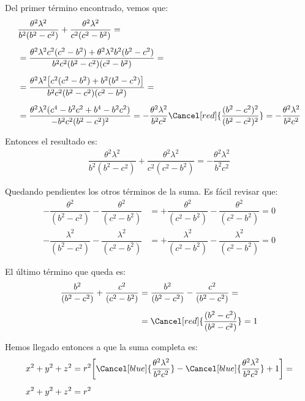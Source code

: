 Del primer término encontrado, vemos que:
\begin{align*}
&{}\dfrac{\theta^{2} \lambda^{2}}{b^{2}(b^{2} - c^{2})} + \dfrac{\theta^{2} \lambda^{2}}{c^{2}(c^{2} - b^{2})} = \\[0.5em] 
&= \dfrac{\theta^{2} \lambda^{2} c^{2} (c^{2} - b^{2}) + \theta^{2} \lambda^{2} b^{2} (b^{2} - c^{2})}{b^{2} c^{2}(b^{2} - c^{2})(c^{2} - b^{2})} = \\[0.5em] 
&= \dfrac{\theta^{2} \lambda^{2} \big[ c^{2} (c^{2} - b^{2}) + b^{2} (b^{2} - c^{2}) \big]}{b^{2} c^{2}(b^{2} - c^{2})(c^{2} - b^{2})} = \\[0.5em] 
&= \dfrac{\theta^{2} \lambda^{2} (c^{4} - b^{2} c^{2} + b^{4} -b^{2} c^{2})}{-b^{2} c^{2} (b^{2} - c^{2})^{2}} = - \dfrac{\theta^{2} \lambda^{2}}{b^{2} c^{2}} \Cancel[red]{\dfrac{(b^{2} - c^{2})^{2}}{(b^{2} - c^{2})^{2}}} = - \dfrac{\theta^{2} \lambda^{2}}{b^{2} c^{2}}
\end{align*}

Entonces el resultado es:
\begin{align*}
\dfrac{\theta^{2} \lambda^{2}}{b^{2}(b^{2} - c^{2})} + \dfrac{\theta^{2} \lambda^{2}}{c^{2}(c^{2} - b^{2})} = - \dfrac{\theta^{2} \lambda^{2}}{b^{2} c^{2}}
\end{align*}

Quedando pendientes los otros términos de la suma. Es fácil revisar que:
\begin{align*}
- \dfrac{\theta^{2}}{(b^{2} {-} c^{2})} {-} \dfrac{\theta^{2}}{(c^{2} {-} b^{2})} &= + \dfrac{\theta^{2}}{(c^{2} {-} b^{2})} {-} \dfrac{\theta^{2}}{(c^{2} {-} b^{2})} = 0 \\[0.5em] 
- \dfrac{\lambda^{2}}{(b^{2} {-} c^{2})} {-} \dfrac{\lambda^{2}}{(c^{2} {-} b^{2})} &= + \dfrac{\lambda^{2}}{(c^{2} {-} b^{2})} {-} \dfrac{\lambda^{2}}{(c^{2} {-} b^{2})} = 0
\end{align*}

El último término que queda es:
\begin{align*}
\dfrac{b^{2}}{(b^{2} - c^{2})} + \dfrac{c^{2}}{(c^{2} - b^{2})} &=  \dfrac{b^{2}}{(b^{2} - c^{2})} - \dfrac{c^{2}}{(b^{2} - c^{2})} = \\[0.5em] 
&= \Cancel[red]{\dfrac{(b^{2} - c^{2})}{(b^{2} - c^{2})}} = 1
\end{align*}

Hemos llegado entonces a que la suma completa es:
\begin{align*}
x^{2} + y^{2} + z^{2} &=  r^{2} \bigg[ \Cancel[blue]{\dfrac{\theta^{2} \lambda^{2}}{b^{2} c^{2}}} - \Cancel[blue]{\dfrac{\theta^{2} \lambda^{2}}{b^{2} c^{2}}} + 1 \bigg] = \\[0.5em] 
x^{2} + y^{2} + z^{2} &= r^{2}
\end{align*}

